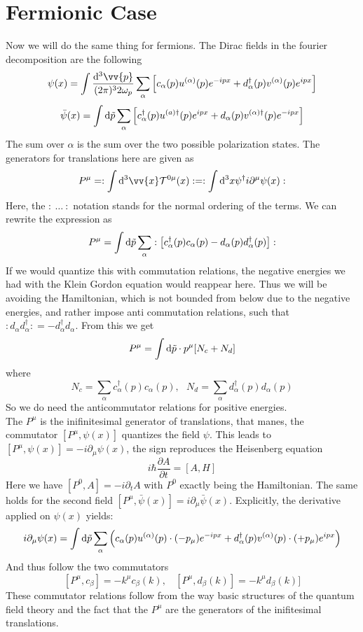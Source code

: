 \documentclass{include/thesisclass}
\newcommand{\cc}{\cdot}
\newcommand{\vx}{\vv{x}}
\newcommand{\vp}{\vv{p}}
\newcommand{\dd}{{\rm d}}
\newcommand{\p}{\partial}
\begin{document}
\section{Fermionic Case}
Now we will do the same thing for fermions. 
The Dirac fields in the fourier decomposition are the following 
\[ \psi(x) = \int \frac{\dd ^3 \vp}{(2\pi)^3 2 \omega_p} \sum_\alpha \left[ c_\alpha(p) u^{(\alpha)}(p) e^{-ipx} + d_\alpha^\dagger(p) v^{(\alpha)}(p) e^{ipx}\right]\]
\[ \bar{\psi}(x) = \int \dd \tilde{p} \sum_\alpha \left[ c_\alpha^\dagger(p)u^{(a)\dagger}(p) e^{ipx} + d_\alpha(p) v^{(\alpha)\dagger}(p) e^{-ipx}\right] \]
The sum over $\alpha$ is the sum over the two possible polarization states.
The generators for translations here are given as
\[ P^\mu = : \int \dd^3\vx \mathcal{T}^{0\mu}(x) : = : \int \dd^3 x \psi^\dagger i \p^\mu \psi(x) :\]
Here, the $:~\ldots~:$ notation stands for the normal ordering of the terms. We can rewrite the expression as
\[ P^\mu = \int \dd \tilde{p} \sum_\alpha : \left[ c_\alpha^\dagger(p) c_\alpha(p) - d_\alpha(p) d_\alpha^\dagger(p) \right]:\]
If we would quantize this with commutation relations, the negative energies we had with the Klein Gordon equation would reappear here. Thus we will be avoiding the Hamiltonian, which is not bounded from below due to the negative energies, and rather impose anti commutation relations, such that $:d_\alpha d_\alpha^\dagger: = - d_\alpha^\dagger d_\alpha$. From this we get
\[ P^\mu = \int \dd \tilde{p} \cc p^\mu [ N_c + N_d]\]
where
\[ N_c = \sum_\alpha c_\alpha^\dagger (p) c_\alpha(p), ~~~ N_d = \sum_\alpha d_\alpha^\dagger (p) d_\alpha(p)\]
So we do need the anticommutator relations for positive energies.\\
The $P^\mu$ is the inifinitesimal generator of translations, that manes, the commutator $[P^\mu, \psi(x)]$ quantizes the field $\psi$. 
This leads to $[P^\mu , \psi(x)] = -i\p_\mu \psi(x)$, the sign reproduces the Heisenberg equation 
\[ i \hbar \frac{\p A}{\p t} = [ A , H]\]
Here we have $[P^0, A] = - i \p_t A$ with $P^0$ exactly being the Hamiltonian.
The same holds for the second field $ [P^\mu, \bar \psi(x) ] = i \p_\mu \bar \psi(x)$.
Explicitly, the derivative applied on $\psi(x)$ yields:
\[ i \p_\mu \psi(x) = \int \dd \tilde p \sum_\alpha \left( c_\alpha(p) u^{(\alpha)} (p) \cc (-p_\mu) e^{-ipx} + d_\alpha^\dagger(p) v^{(\alpha)}(p) \cc  (+p_\mu)e^{ipx} \right)\]
And thus follow the two commutators
\[ [P^\mu, c_\beta] = - k^\mu c_\beta(k), ~~~~ [P^\mu, d_\beta(k)] = -k^\mu d_\beta(k)]\]
These commutator relations follow from the way basic structures of the quantum field theory and the fact that the $P^\mu$ are the generators of the inifitesimal translations.\\
\end{document}
